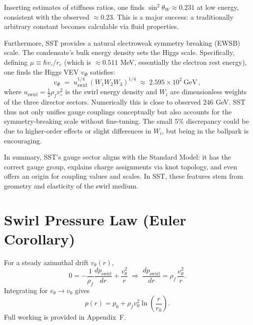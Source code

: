 \documentclass[reprint,aps,onecolumn,nofootinbib]{revtex4-2}
\newcommand{\rhof}{\rho_{\!f}}                           %
\begin{document}
	\noindent Inserting estimates of stiffness ratios, one finds $\sin^2\theta_W \approx 0.231$ at low energy, consistent with the observed $\approx0.23$. This is a major success: a traditionally arbitrary constant becomes calculable via fluid properties.

	Furthermore, SST provides a natural electroweak symmetry breaking (EWSB) scale. The condensate’s bulk energy density sets the Higgs scale. Specifically, defining $\mu \equiv \hbar v_{\circ}/r_c$ (which is $\approx0.511$ MeV, essentially the electron rest energy), one finds the Higgs VEV $v_{\Phi}$ satisfies:
	\[
		v_{\Phi} \;=\; u_{\text{swirl}}^{1/4}\,(W_1 W_2 W_3)^{1/4} \;\approx\; 2.595\times 10^2~\text{GeV}\,,
	\]
	where $u_{\text{swirl}} = \frac{1}{2}\rho_f v_{\circ}^2$ is the swirl energy density and $W_i$ are dimensionless weights of the three director sectors. Numerically this is close to observed $246$ GeV. SST thus not only unifies gauge couplings conceptually but also accounts for the symmetry-breaking scale without fine-tuning. The small 5\% discrepancy could be due to higher-order effects or slight differences in $W_i$, but being in the ballpark is encouraging.

	In summary, SST’s gauge sector aligns with the Standard Model: it has the correct gauge group, explains charge assignments via knot topology, and even offers an origin for coupling values and scales. In SST, these features stem from geometry and elasticity of the swirl medium.

    \section{Swirl Pressure Law (Euler Corollary)}\label{canon58:pressure}
    For a steady azimuthal drift $v_\theta(r)$,
    \[
        0=-\frac{1}{\rhof}\frac{dp_{\text{swirl}}}{dr}+\frac{v_\theta^2}{r}
        \;\Rightarrow\;
        \frac{dp_{\text{swirl}}}{dr}=\rhof\,\frac{v_\theta^2}{r}.
    \]
    Integrating for $v_\theta\to v_0$ gives
    \[
        p(r)=p_0+\rhof v_0^2\ln\!\left(\frac{r}{r_0}\right).
    \]
    Full working is provided in Appendix~F.


\end{document}
